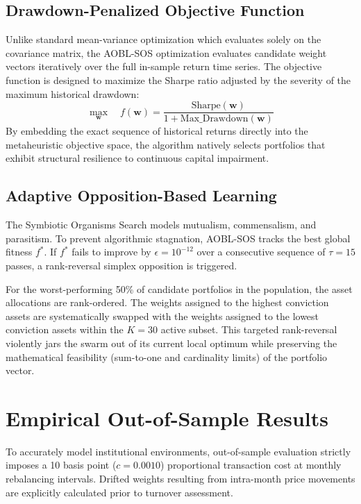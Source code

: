 \documentclass[11pt,a4paper]{article}
\begin{document}
\subsection{Drawdown-Penalized Objective Function}
Unlike standard mean-variance optimization which evaluates solely on the covariance matrix, the AOBL-SOS optimization evaluates candidate weight vectors iteratively over the full in-sample return time series. The objective function is designed to maximize the Sharpe ratio adjusted by the severity of the maximum historical drawdown:
\begin{equation}
\max_{\mathbf{w}} \quad f(\mathbf{w}) = \frac{\text{Sharpe}(\mathbf{w})}{1 + \text{Max\_Drawdown}(\mathbf{w})}
\end{equation}
By embedding the exact sequence of historical returns directly into the metaheuristic objective space, the algorithm natively selects portfolios that exhibit structural resilience to continuous capital impairment.

\subsection{Adaptive Opposition-Based Learning}
The Symbiotic Organisms Search models mutualism, commensalism, and parasitism. To prevent algorithmic stagnation, AOBL-SOS tracks the best global fitness $f^*$. If $f^*$ fails to improve by $\epsilon = 10^{-12}$ over a consecutive sequence of $\tau = 15$ passes, a rank-reversal simplex opposition is triggered. 

For the worst-performing 50\% of candidate portfolios in the population, the asset allocations are rank-ordered. The weights assigned to the highest conviction assets are systematically swapped with the weights assigned to the lowest conviction assets within the $K=30$ active subset. This targeted rank-reversal violently jars the swarm out of its current local optimum while preserving the mathematical feasibility (sum-to-one and cardinality limits) of the portfolio vector.

\section{Empirical Out-of-Sample Results}

To accurately model institutional environments, out-of-sample evaluation strictly imposes a 10 basis point ($c = 0.0010$) proportional transaction cost at monthly rebalancing intervals. Drifted weights resulting from intra-month price movements are explicitly calculated prior to turnover assessment.
\end{document}
